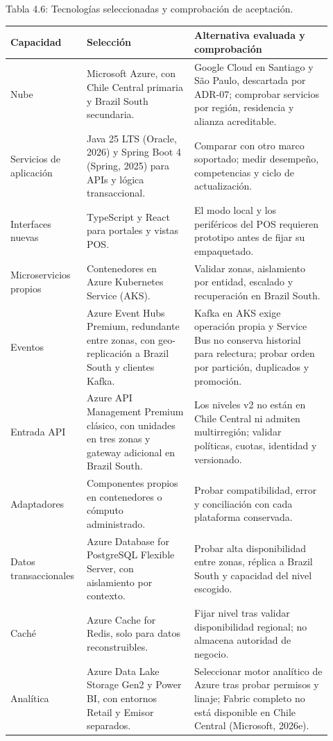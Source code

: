 \documentclass[11pt]{article}
\begin{document}
Tabla 4.6: Tecnologías seleccionadas y comprobación de aceptación.\par\nopagebreak
\begin{longtable}{@{}p{0.19\linewidth}p{0.32\linewidth}p{0.41\linewidth}@{}}
\toprule Capacidad & Selección & Alternativa evaluada y comprobación \\
\midrule\endhead\bottomrule\endlastfoot
Nube & Microsoft Azure, con Chile Central primaria y Brazil South secundaria. & Google Cloud en Santiago y São Paulo, descartada por ADR-07; comprobar servicios por región, residencia y alianza acreditable. \\
Servicios de aplicación & Java 25 LTS (Oracle, 2026) y Spring Boot 4 (Spring, 2025) para APIs y lógica transaccional. & Comparar con otro marco soportado; medir desempeño, competencias y ciclo de actualización. \\
Interfaces nuevas & TypeScript y React para portales y vistas POS. & El modo local y los periféricos del POS requieren prototipo antes de fijar su empaquetado. \\
Microservicios propios & Contenedores en Azure Kubernetes Service (AKS). & Validar zonas, aislamiento por entidad, escalado y recuperación en Brazil South. \\
Eventos & Azure Event Hubs Premium, redundante entre zonas, con geo-replicación a Brazil South y clientes Kafka. & Kafka en AKS exige operación propia y Service Bus no conserva historial para relectura; probar orden por partición, duplicados y promoción. \\
Entrada API & Azure API Management Premium clásico, con unidades en tres zonas y gateway adicional en Brazil South. & Los niveles v2 no están en Chile Central ni admiten multirregión; validar políticas, cuotas, identidad y versionado. \\
Adaptadores & Componentes propios en contenedores o cómputo administrado. & Probar compatibilidad, error y conciliación con cada plataforma conservada. \\
Datos transaccionales & Azure Database for PostgreSQL Flexible Server, con aislamiento por contexto. & Probar alta disponibilidad entre zonas, réplica a Brazil South y capacidad del nivel escogido. \\
Caché & Azure Cache for Redis, solo para datos reconstruibles. & Fijar nivel tras validar disponibilidad regional; no almacena autoridad de negocio. \\
Analítica & Azure Data Lake Storage Gen2 y Power BI, con entornos Retail y Emisor separados. & Seleccionar motor analítico de Azure tras probar permisos y linaje; Fabric completo no está disponible en Chile Central (Microsoft, 2026e). \\

\end{longtable}
\end{document}
